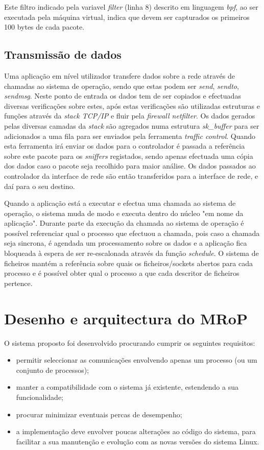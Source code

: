 Este filtro indicado pela variavel \textit{filter} (linha 8) descrito em linguagem \textit{bpf}, ao ser executada pela máquina virtual, indica que devem ser capturados os primeiros 100 bytes de cada pacote.

\subsection{Transmissão de dados}

Uma aplicação em nível utilizador transfere dados sobre a rede através de chamadas ao sistema de operação, sendo que estas podem ser \textit{send}, \textit{sendto}, \textit{sendmsg}.
Neste ponto de entrada os dados tem de ser copiados e efectuadas diversas verificações sobre estes, após estas verificações são utilizadas estruturas e funções através da \textit{stack TCP/IP} e fluir pela \textit{firewall netfilter}.
Os dados gerados pelas diversas camadas da \textit{stack} são agregados numa estrutura \textit{sk\_buffer} para ser adicionados a uma fila para ser enviados pela ferramenta \textit{traffic control}.
Quando esta ferramenta irá enviar os dados para o controlador é passada a referência sobre este pacote para os \textit{sniffers} registados, sendo apenas efectuada uma cópia dos dados caso o pacote seja recolhido para maior análise. Os dados passados ao controlador da interface de rede são então transferidos para a interface de rede, e daí para o seu destino.

Quando a aplicação está a executar e efectua uma chamada ao sistema de operação, o sistema muda de modo e executa dentro do núcleo "em nome da aplicação".
 Durante parte da execução da chamada ao sistema de operação é possível referenciar qual o processo que efectuou a chamada, pois caso a chamada seja sincrona, é agendada um processamento sobre os dados e a aplicação fica bloqueada à espera de ser re-escalonada através da função \textit{schedule}.
 O sistema de ficheiros mantém a referência sobre quais os ficheiros/sockets abertos para cada processo e é possível obter qual o processo a que cada descritor de ficheiros pertence. %

\section{Desenho e arquitectura do MRoP}
\label{sec:mrop_architecture}

O sistema proposto foi desenvolvido procurando cumprir os seguintes requisitos:
\begin{itemize}
\item permitir seleccionar as comunicações envolvendo apenas um processo (ou um conjunto de processos);
\item manter a compatibilidade com o sistema já existente, estendendo a sua funcionalidade;
\item procurar minimizar eventuais percas de desempenho;
\item a implementação deve envolver poucas alterações ao código do sistema, para facilitar a sua manutenção e evolução com as novas versões do sistema Linux.
\end{itemize}

